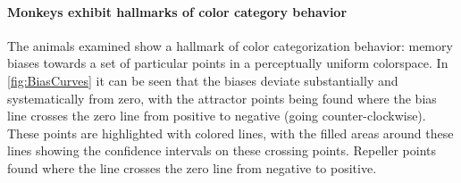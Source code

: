
\paragraph{Monkeys exhibit hallmarks of color category behavior}

The animals examined show a hallmark of color categorization behavior: memory biases towards a set of particular points in a perceptually uniform colorspace.
In \autoref{fig:BiasCurves} it can be seen that the biases deviate substantially and systematically from zero, with the attractor points being found where the bias line crosses the zero line from positive to negative (going counter-clockwise). These points are highlighted with colored lines, with the filled areas around these lines showing the confidence intervals on these crossing points. Repeller points found where the line crosses the zero line from negative to positive.

